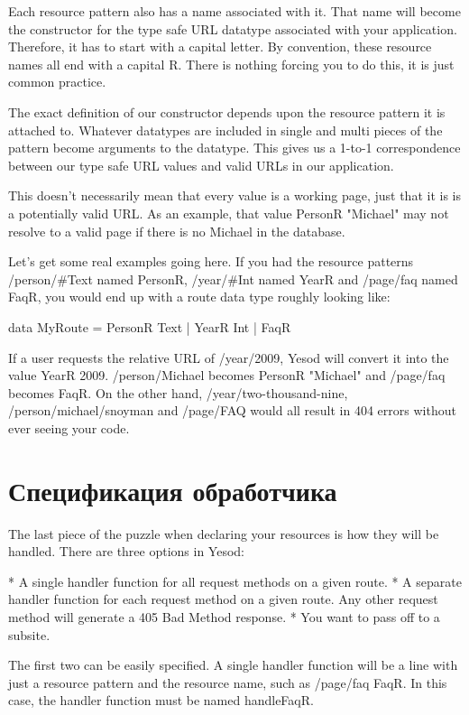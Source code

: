 Each resource pattern also has a name associated with it. That name
will become the constructor for the type safe URL datatype associated
with your application. Therefore, it has to start with a capital
letter. By convention, these resource names all end with a capital
R. There is nothing forcing you to do this, it is just common
practice.

The exact definition of our constructor depends upon the resource
pattern it is attached to. Whatever datatypes are included in single
and multi pieces of the pattern become arguments to the datatype. This
gives us a 1-to-1 correspondence between our type safe URL values and
valid URLs in our application.

This doesn't necessarily mean that every value is a working page, just
that it is is a potentially valid URL. As an example, that value
PersonR "Michael" may not resolve to a valid page if there is no
Michael in the database.

Let's get some real examples going here. If you had the resource
patterns /person/#Text named PersonR, /year/#Int named YearR and
/page/faq named FaqR, you would end up with a route data type roughly
looking like:

data MyRoute = PersonR Text
             | YearR Int
             | FaqR

If a user requests the relative URL of /year/2009, Yesod will convert
it into the value YearR 2009. /person/Michael becomes PersonR
"Michael" and /page/faq becomes FaqR. On the other hand,
/year/two-thousand-nine, /person/michael/snoyman and /page/FAQ would
all result in 404 errors without ever seeing your code.

\section{Спецификация обработчика}

The last piece of the puzzle when declaring your resources is how they
will be handled. There are three options in Yesod:

* A single handler function for all request methods on a given route.
* A separate handler function for each request method on a given route. Any other request method will generate a 405 Bad Method response.
* You want to pass off to a subsite.

The first two can be easily specified. A single handler function will
be a line with just a resource pattern and the resource name, such as
/page/faq FaqR. In this case, the handler function must be named
handleFaqR.

